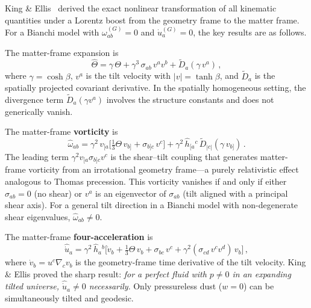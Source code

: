 King \& Ellis~\cite{KingEllis1973} derived the exact nonlinear
transformation of all kinematic quantities under a Lorentz boost
from the geometry frame to the matter frame.  For a Bianchi
model with $\omega_{ab}^{(G)} = 0$ and
$\dot{u}_a^{(G)} = 0$, the key results are as follows.

The matter-frame expansion is
\begin{equation}\label{eq:KE-Theta}
\hat{\Theta}
= \gamma\,\Theta + \gamma^3\,\sigma_{ab}\,v^a v^b
  + \tilde{D}_a(\gamma\, v^a)\,,
\end{equation}
where $\gamma = \cosh\beta$, $v^a$ is the tilt velocity with
$|v| = \tanh\beta$, and $\tilde{D}_a$ is the spatially projected
covariant derivative.  In the spatially homogeneous setting,
the divergence term $\tilde{D}_a(\gamma v^a)$ involves the
structure constants and does not generically vanish.

The matter-frame \textbf{vorticity} is
\begin{equation}\label{eq:KE-omega}
\hat{\omega}_{ab}
= \gamma^2\,v_{[a}\bigl[\tfrac{1}{3}\Theta\,v_{b]}
  + \sigma_{b]c}\,v^c\bigr]
  + \gamma^2\,\hat{h}_{[a}{}^c\,\tilde{D}_{|c|}
    (\gamma\,v_{b]})\,.
\end{equation}
The leading term $\gamma^2 v_{[a}\sigma_{b]c}v^c$ is the
shear--tilt coupling that generates matter-frame vorticity
from an irrotational geometry frame---a purely relativistic
effect analogous to Thomas precession.  This vorticity vanishes
if and only if either $\sigma_{ab} = 0$ (no shear) or $v^a$
is an eigenvector of $\sigma_{ab}$ (tilt aligned with a
principal shear axis).  For a general tilt direction in a
Bianchi model with non-degenerate shear eigenvalues,
$\hat{\omega}_{ab} \neq 0$.

The matter-frame \textbf{four-acceleration} is
\begin{equation}\label{eq:KE-udot}
\hat{\dot{u}}_a
= \gamma^2\,\hat{h}_a{}^b\bigl[
  \dot{v}_b + \tfrac{1}{3}\Theta\,v_b
  + \sigma_{bc}\,v^c
  + \gamma^2(\sigma_{cd}\,v^c v^d)\,v_b
\bigr]\,,
\end{equation}
where $\dot{v}_b = u^c\nabla_c v_b$ is the geometry-frame time
derivative of the tilt velocity.  King \& Ellis proved the
sharp result: \emph{for a perfect fluid with $p \neq 0$ in an
expanding tilted universe, $\hat{\dot{u}}_a \neq 0$
necessarily}.  Only pressureless dust ($w = 0$) can be
simultaneously tilted and geodesic.

